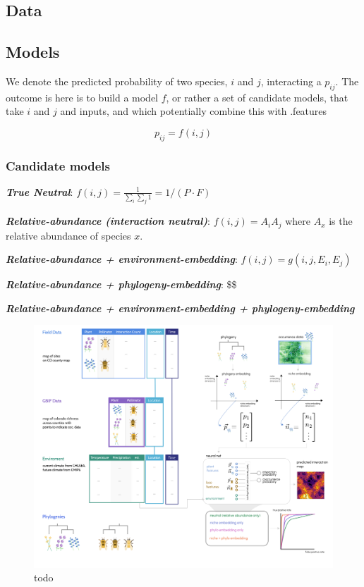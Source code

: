 \documentclass[10pt,oneside]{article}
\makeatletter
\def\maxwidth{\ifdim\Gin@nat@width>\linewidth\linewidth
\else\Gin@nat@width\fi}
\let\Oldincludegraphics\includegraphics
\renewcommand{\includegraphics}[1]{\Oldincludegraphics[width=\maxwidth]{#1}}
\makeatother
\begin{document}
\hypertarget{data}{%
\subsection{Data}\label{data}}

\hypertarget{models}{%
\subsection{Models}\label{models}}

We denote the predicted probability of two species, \(i\) and \(j\),
interacting a \(p_{ij}\). The outcome is here is to build a model \(f\),
or rather a set of candidate models, that take \(i\) and \(j\) and
inputs, and which potentially combine this with .features

\[p_{ij} = f(i,j)\]

\hypertarget{candidate-models}{%
\subsubsection{Candidate models}\label{candidate-models}}

\textbf{\emph{True Neutral}}:
\(f(i,j) = \frac{1}{\sum_i \sum_j 1} = 1 / (P\cdot F)\)

\textbf{\emph{Relative-abundance (interaction neutral)}}:
\(f(i,j) = A_i A_j\) where \(A_x\) is the relative abundance of species
\(x\).

\textbf{\emph{Relative-abundance + environment-embedding}}:
\(f(i,j) = g(i,j, E_i, E_j)\)

\textbf{\emph{Relative-abundance + phylogeny-embedding}}: \$\$

\textbf{\emph{Relative-abundance + environment-embedding +
phylogeny-embedding}}

\begin{figure}
\hypertarget{fig:concept}{%
\centering
\includegraphics{./figures/concept_v2.png}
\caption{todo}\label{fig:concept}
}
\end{figure}
\end{document}
